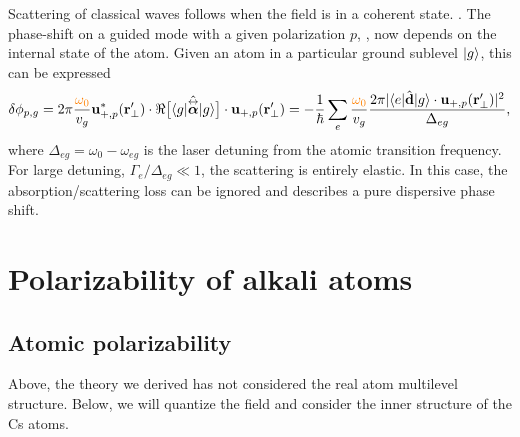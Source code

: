 Scattering of classical waves follows when the field is in a coherent state.  .  The phase-shift on a guided mode with a given polarization $p$, , now depends on the internal state of the atom.  Given an atom in a particular ground sublevel $\lvert{g}\rangle$, this can be expressed \cite{LeKien2014a}
	\begin{equation} \label{Eq::PhaseShiftMultilevel}
		\delta  \phi_{p,g} =2\pi \frac{\comment{ \omega_{0}}}{v_g} \mathbf{u}^*_{+, p}(\br'_\perp) \cdot \Re \big[\bra{g} 
\hat{\tensor{\boldsymbol{\alpha}}} \ket{g} \big] \cdot \mathbf{u}_{+, p}(\br'_\perp) = -\frac{1}{\hbar} \sum_e \frac{ \comment{ \omega_{0} } }{v_g} \frac{2 \pi |\bra{e}\hat{\mathbf{d}}\ket{g} \cdot \mathbf{u}_{+,p}(\br'_\perp)|^2}{ \Delta_{eg} } ,
	\end{equation}
where $\Delta_{eg} = \omega_0 - \omega_{eg}$ is the laser detuning from the atomic transition frequency.  For large detuning, $\Gamma_{e}/\Delta_{eg} \ll 1$, the scattering is entirely elastic.  In this case, the absorption/scattering loss can be ignored and  describes a pure dispersive phase shift.




\section{Polarizability of alkali atoms}
\subsection{Atomic polarizability}
Above, the theory we derived has not considered the real atom multilevel structure. Below, we will quantize the field and consider the inner structure of the Cs atoms.

